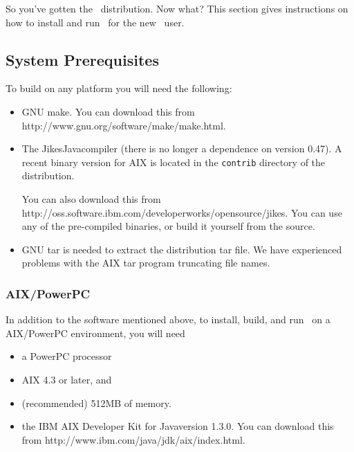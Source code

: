 So you've gotten the \jp\ distribution.  Now what?  This section gives
instructions on how to install and run \jp\ for the new \jp\ user.

\subsection{System Prerequisites}
To build on any platform you will need the following:
\begin{itemize}
\item GNU make. You can download this from
           {http://www.gnu.org/software/make/make.html}.

\item The Jikes\trademark Java\trademark compiler (there is no longer a dependence on
version 0.47). A recent binary version for AIX is located in the
{\tt contrib} directory of the distribution.

You can also download this from
           {http://oss.software.ibm.com/developerworks/opensource/jikes}.
You can use any of the pre-compiled binaries, or build it yourself from the
source.

\item GNU tar is needed to extract the distribution tar file.  We have
experienced problems with the AIX tar program truncating file names.

\end{itemize}

\subsubsection{AIX/PowerPC}
In addition to the software mentioned above, to install, build, and
run \jp\ on a AIX/PowerPC environment, 
you will need 
\begin{itemize}
\item a PowerPC processor
\item AIX 4.3 or later, and
\item (recommended) 512MB of memory.
\item the IBM AIX Developer Kit for Java\trademark version 1.3.0.  You can download this from
           {http://www.ibm.com/java/jdk/aix/index.html}.
\end{itemize}

